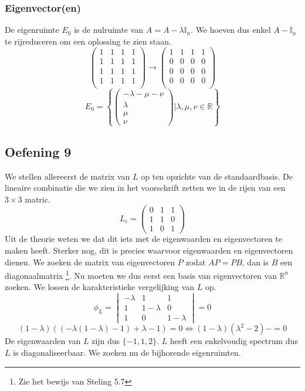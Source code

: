 \documentclass[lineaire_algebra_oplossingen.tex]{subfiles}
\begin{document}
\subsubsection*{Eigenvector(en)}
De eigenruimte $E_0$ is de nulruimte van $A = A-\lambda\mathbb{I}_n$. We hoeven dus enkel $A-\mathbb{I}_n$ te rijreduceren om een oplossing te zien staan.
\[
\begin{pmatrix}
1 & 1 & 1 & 1\\
1 & 1 & 1 & 1\\
1 & 1 & 1 & 1\\
1 & 1 & 1 & 1\\
\end{pmatrix}
\rightarrow
\begin{pmatrix}
1 & 1 & 1 & 1\\
0 & 0 & 0 & 0\\
0 & 0 & 0 & 0\\
0 & 0 & 0 & 0\\
\end{pmatrix}
\]
\[
E_0 = 
\left\lbrace
\begin{pmatrix}
-\lambda-\mu-\nu\\\lambda\\\mu\\\nu
\end{pmatrix}
| \lambda,\mu,\nu\in\mathbb{R}
\right\rbrace
\]


\subsection{Oefening 9}
We stellen allereerst de matrix van $L$ op ten opzichte van de standaardbasis. De lineaire combinatie die we zien in het voorschrift zetten we in de rijen van een $3\times 3$ matric.
\[
L_\epsilon = 
\begin{pmatrix}
0 & 1 & 1\\
1 & 1 & 0\\
1 & 0 & 1
\end{pmatrix}
\]
Uit de theorie weten we dat dit iets met de eigenwaarden en eigenvectoren te maken heeft. Sterker nog, dit is precies waarvoor eigenwaarden en eigenvectoren dienen. We zoeken de matrix van eigenvectoren $P$ zodat $AP = PB$, dan is $B$ een diagonaalmatrix \footnote{Zie het bewijs van Steling 5.7}.
Nu moeten we dus eerst een basis van eigenvectoren van $\mathbb{R}^n$ zoeken.
We lossen de karakteristieke vergelijking van $L$ op.
\[
\phi_L = 
\begin{vmatrix}
-\lambda & 1 & 1\\
1 & 1-\lambda & 0\\
1 & 0 & 1-\lambda
\end{vmatrix}
= 0
\]
\[
(1-\lambda)((-\lambda(1-\lambda)-1) +\lambda-1) = 0 \Leftrightarrow (1-\lambda)(\lambda^2-2)-=0
\]
De eigenwaarden van $L$ zijn dus $\{-1,1,2\}$. $L$ heeft een enkelvoudig spectrum dus $L$ is diagonaliseerbaar.
We zoeken nu de bijhorende eigenruimten.
\end{document}
